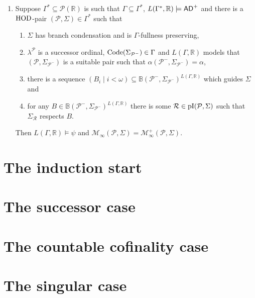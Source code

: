 \documentclass[../../main]{subfiles}
\begin{document}
{\begin{enumerate}
    \item Suppose $\Gamma^{*} \subseteq \mathcal{P}(\mathbb{R})$ is such that $\Gamma \subseteq \Gamma^{*}$, $L(\Gamma^{*}, \mathbb{R}) \models \textsf{AD}^{+}$ and there is a $\operatorname{HOD}$-pair $(\mathcal{P}, \Sigma) \in \Gamma^{*}$ such that
      \begin{enumerate}
        \item $\Sigma$ has branch condensation and is $\Gamma$-fullness preserving,
        \item $\lambda^{\mathcal{P}}$ is a successor ordinal, $\operatorname{Code}(\Sigma_{\mathcal{P}^{-}}) \in \Gamma$ and $L(\Gamma, \mathbb{R})$ models that $(\mathcal{P}, \Sigma_{\mathcal{P}^{-}})$ is a suitable pair such that $\alpha(\mathcal{P}^{-}, \Sigma_{\mathcal{P}^{-}}) = \alpha$, 
        \item there is a sequence $(B_{i} \mid i < \omega) \subseteq \mathbb{B}(\mathcal{P}^{-}, \Sigma_{\mathcal{P}^{-}})^{L(\Gamma, \mathbb{R})}$ which guides $\Sigma$ and 
        \item for any $B \in \mathbb{B}(\mathcal{P}^{-}, \Sigma_{\mathcal{P}^{-}})^{L(\Gamma, \mathbb{R})}$ there is some $\mathcal{R} \in \operatorname{pI}(\mathcal{P}, \Sigma)$ such that $\Sigma_{\mathcal{R}}$ respects $B$. 
      \end{enumerate}

      Then $L(\Gamma, \mathbb{R}) \models \psi$ and $\mathcal{M}_{\infty}(\mathcal{P}, \Sigma) = \mathcal{M}^{+}_{\infty}(\mathcal{P}, \Sigma)$.
  \end{enumerate}
}


\section{The induction start}
\lipsum[1]

\section{The successor case}
\lipsum[1]

\section{The countable cofinality case}
\lipsum[1]

\section{The singular case}
\lipsum[1]
\end{document}

